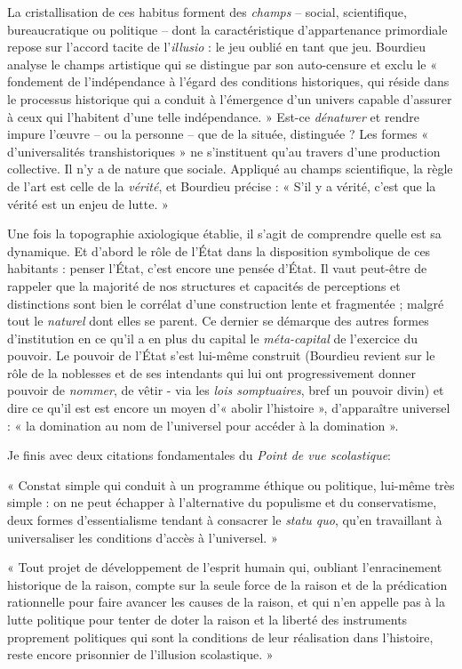 \documentclass[11pt]{amsart}
\begin{document}
La cristallisation de ces habitus forment des \textit{champs} – social, scientifique, bureaucratique ou politique – dont la caractéristique d'appartenance primordiale repose sur l'accord tacite de l'\textit{illusio} : le jeu oublié en tant que jeu. Bourdieu analyse le champs artistique qui se distingue par son auto-censure et exclu le « fondement de l’indépendance à l'égard des conditions historiques, qui réside dans le processus historique qui a conduit à l'émergence d'un univers capable d'assurer à ceux qui l'habitent d'une telle indépendance. » Est-ce \textit{dénaturer} et rendre impure l’œuvre – ou la personne – que de la située, distinguée ? Les formes « d'universalités transhistoriques » ne s'instituent qu'au travers d'une production collective. Il n'y a de nature que sociale. Appliqué au champs scientifique, la règle de l'art est celle de la \textit{vérité}, et Bourdieu précise : « S'il y a vérité, c'est que la vérité est un enjeu de lutte. » 

Une fois la topographie axiologique établie, il s'agit de comprendre quelle est sa dynamique. Et d'abord le rôle de l’État dans la disposition symbolique de ces habitants : penser l’État, c'est encore une pensée d’État. Il vaut peut-être de rappeler que la majorité de nos structures et capacités de perceptions et distinctions sont bien le corrélat d'une construction lente et fragmentée ; malgré tout le \textit{naturel} dont elles se parent. Ce dernier se démarque des autres formes d'institution en ce qu'il a en plus du capital le \textit{méta-capital} de l'exercice du pouvoir. Le pouvoir de l’État s'est lui-même construit (Bourdieu revient sur le rôle de la noblesses et de ses intendants qui lui ont progressivement donner pouvoir de \textit{nommer}, de vêtir - via les \textit{lois somptuaires}, bref un pouvoir divin) et dire ce qu'il est est encore un moyen d'« abolir l'histoire », d’apparaître universel : « la domination au nom de l'universel pour accéder à la domination ».

Je finis avec deux citations fondamentales du \textsl{Point de vue scolastique}:

\hspace{0.3cm}

\begin{center}« Constat simple qui conduit à un programme éthique ou politique, lui-même très simple : on ne peut échapper à l'alternative du populisme et du conservatisme, deux formes d'essentialisme tendant à consacrer le \textit{statu quo}, qu'en travaillant à universaliser les conditions d'accès à l'universel. » 

\hspace*{0.2cm}

« Tout projet de développement de l'esprit humain qui, oubliant l'enracinement historique de la raison, compte sur la seule force de la raison et de la prédication rationnelle pour faire avancer les causes de la raison, et qui n'en appelle pas à la lutte politique pour tenter de doter la raison et la liberté des instruments proprement politiques qui sont la conditions de leur réalisation dans l'histoire, reste encore prisonnier de l'illusion scolastique. »\end{center}
\end{document}
